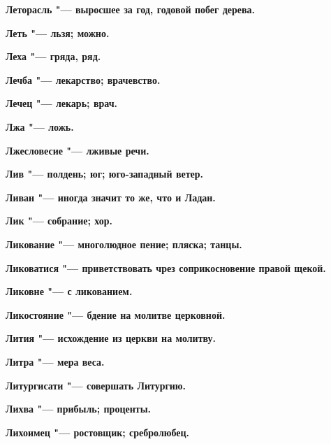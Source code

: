 \begin{mymulticols}{2}
\bfseries Леторасль\normalfont{} "--- выросшее за год, годовой побег дерева. 




\bfseries Леть\normalfont{} "--- льзя; можно. 




\bfseries Леха\normalfont{} "--- гряда, ряд. 




\bfseries Лечба\normalfont{} "--- лекарство; врачевство. 




\bfseries Лечец\normalfont{} "--- лекарь; врач. 




\bfseries Лжа\normalfont{} "--- ложь. 




\bfseries Лжесловесие\normalfont{} "--- лживые речи. 




\bfseries Лив\normalfont{} "--- полдень; юг; юго-западный ветер. 




\bfseries Ливан\normalfont{} "--- иногда значит то же, что и Ладан. 




\bfseries Лик\normalfont{} "--- собрание; хор. 




\bfseries Ликование\normalfont{} "--- многолюдное пение; пляска; танцы. 




\bfseries Ликоватися\normalfont{} "--- приветствовать чрез соприкосновение правой щекой. 




\bfseries Ликовне\normalfont{} "--- с ликованием. 




\bfseries Ликостояние\normalfont{} "--- бдение на молитве церковной. 




\bfseries Лития\normalfont{} "--- исхождение из церкви на молитву. 




\bfseries Литра\normalfont{} "--- мера веса. 




\bfseries Литургисати\normalfont{} "--- совершать Литургию. 




\bfseries Лихва\normalfont{} "--- прибыль; проценты. 




\bfseries Лихоимец\normalfont{} "--- ростовщик; сребролюбец. 





\end{mymulticols}

